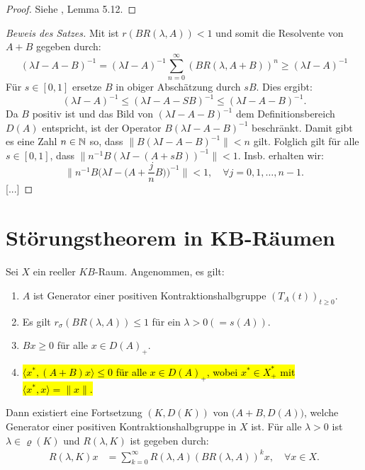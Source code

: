 \begin{proof}
Siehe \cite{banasiak_arlotti_2006}, Lemma 5.12.
\end{proof}

\begin{proof}[Beweis des Satzes]
Mit \Cref{} ist $r(BR(\lambda, A))< 1$ und somit die Resolvente von $A+B$ gegeben durch:
\begin{equation*}
(\lambda I-A-B)^{-1}=(\lambda I-A)^{-1}\sum_{n=0}^\infty (BR(\lambda, A+B))^n\geq(\lambda I-A)^{-1}
\end{equation*}
Für $s\in[0,1]$ ersetze $B$ in obiger Abschätzung durch $sB$. Dies ergibt:
\begin{equation*}
(\lambda I-A)^{-1}\leq (\lambda I- A-SB)^{-1}\leq (\lambda I-A-B)^{-1}.
\end{equation*}
Da $B$ positiv ist und das Bild von $(\lambda I-A-B)^{-1}$ dem Definitionsbereich $D(A)$ entspricht, ist der Operator $B(\lambda I-A-B)^{-1}$ beschränkt. Damit gibt es eine Zahl $n\in\mathbb{N}$ so, dass $\|B(\lambda I- A-B)^{-1}\|< n$ gilt. Folglich gilt für alle $s\in[0,1]$, dass $\|n^{-1}B(\lambda I-(A+sB))^{-1}\|<1$. Insb. erhalten wir:
\begin{equation*}
\|n^{-1}B\Big(\lambda I-\Big(A+\frac{j}{n}B\Big)\Big)^{-1}\|<1,\quad\forall  j=0,1,\dots,n-1.
\end{equation*}
[...]
\end{proof}

\section{Störungstheorem in KB-Räumen}

\begin{fsatz}\cite{banasiak_lachowicz_2007}\label{Hauptaussage}
Sei $X$ ein reeller $KB$-Raum. Angenommen, es gilt:
\begin{enumerate}
\item $A$ ist Generator einer positiven Kontraktionshalbgruppe  $(T_A(t))_{t\geq0}$.
\item Es gilt $r_\sigma(BR(\lambda, A))\leq1$ für ein $\lambda >0(=s(A))$.
\item $Bx\geq0$ für alle $x\in D(A)_+$.
\item \hl{$\langle x^*, (A+B)x\rangle\leq 0$ für alle $x\in D(A)_+$, wobei  $x^*\in X^*_+$ mit   $\langle x^*, x\rangle = \|x\|$.}
\end{enumerate}
Dann existiert eine Fortsetzung $(K, D(K))$ von $\big(A+B, D(A)\big)$, welche Generator einer positiven Kontraktionshalbgruppe in $X$ ist. Für alle $\lambda >0$ ist $\lambda\in\varrho(K)$ und $R(\lambda, K)$ ist gegeben durch:
\begin{align*}\label{Darstellung der Resolvente von K}
R(\lambda, K)x
&=\sum_{k=0}^\infty R(\lambda, A)(BR(\lambda, A))^kx,\quad \forall x\in X.
\end{align*}
\end{fsatz}

